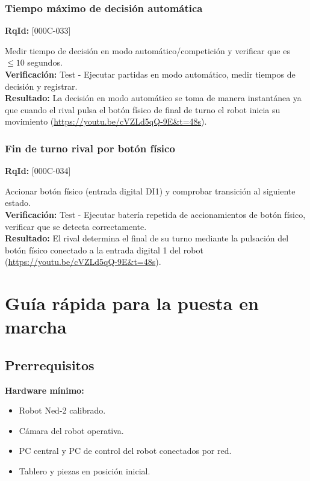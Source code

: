 \documentclass[12pt,a4paper]{article}
\begin{document}
\subsubsection{Tiempo máximo de decisión automática}
\textbf{RqId:} [000C-033]
\vspace{0.3em}
\par Medir tiempo de decisión en modo automático/competición y verificar que es $\leq 10$ segundos.
\\ \textbf{Verificación:} Test - Ejecutar partidas en modo automático, medir tiempos de decisión y registrar.
\\ \textbf{Resultado:} La decisión en modo automático se toma de manera instantánea ya que cuando el rival pulsa el botón físico de final de turno el robot inicia su movimiento (\url{https://youtu.be/cVZLd5qQ-9E&t=48s}).

\subsubsection{Fin de turno rival por botón físico}
\textbf{RqId:} [000C-034]
\vspace{0.3em}
\par Accionar botón físico (entrada digital DI1) y comprobar transición al siguiente estado.
\\ \textbf{Verificación:} Test - Ejecutar batería repetida de accionamientos de botón físico, verificar que se detecta correctamente.
\\ \textbf{Resultado:} El rival determina el final de su turno mediante la pulsación del botón físico conectado a la entrada digital 1 del robot (\url{https://youtu.be/cVZLd5qQ-9E&t=48s}).

\section{Gu\'ia r\'apida para la puesta en marcha}

\subsection{Prerrequisitos}
\textbf{Hardware m\'inimo:}
\begin{itemize}
  \item Robot Ned-2 calibrado.
  \item C\'amara del robot operativa.
  \item PC central y PC de control del robot conectados por red.
  \item Tablero y piezas en posici\'on inicial.
\end{itemize}
\end{document}
